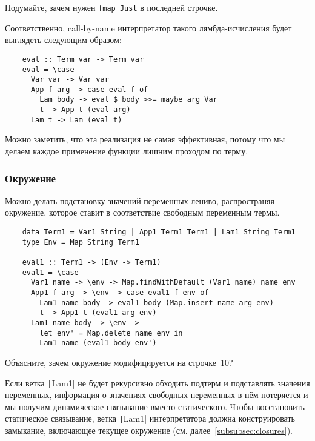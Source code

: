 \begin{task}
    Подумайте, зачем нужен \texttt{fmap Just} в последней строчке.
\end{task}

Соответственно, call-by-name интерпретатор такого лямбда-исчисления будет выглядеть следующим образом:

\begin{verbatim}
    eval :: Term var -> Term var
    eval = \case
      Var var -> Var var
      App f arg -> case eval f of
        Lam body -> eval $ body >>= maybe arg Var
        t -> App t (eval arg)
      Lam t -> Lam (eval t)
\end{verbatim}

Можно заметить, что эта реализация не самая эффективная, потому что мы делаем каждое применение функции лишним проходом по терму.

\subsubsection{Окружение}

Можно делать подстановку значений переменных лениво, распространяя окружение, которое ставит в соответствие свободным переменным термы.

\begin{verbatim}
    data Term1 = Var1 String | App1 Term1 Term1 | Lam1 String Term1
    type Env = Map String Term1

    eval1 :: Term1 -> (Env -> Term1)
    eval1 = \case
      Var1 name -> \env -> Map.findWithDefault (Var1 name) name env
      App1 f arg -> \env -> case eval1 f env of
        Lam1 name body -> eval1 body (Map.insert name arg env)
        t -> App1 t (eval1 arg env)
      Lam1 name body -> \env ->
        let env' = Map.delete name env in
        Lam1 name (eval1 body env')
\end{verbatim}

\begin{task}
    Объясните, зачем окружение модифицируется на строчке~10?
\end{task}

Если ветка \texttt|Lam1| не будет рекурсивно обходить подтерм и подставлять значения переменных, информация о значениях свободных переменных в нём потеряется и мы получим динамическое связывание вместо статического.
Чтобы восстановить статическое связывание, ветка \texttt|Lam1| интерпретатора должна конструировать замыкание, включающее текущее окружение (см. далее~\ref{subsubsec:closures}).

